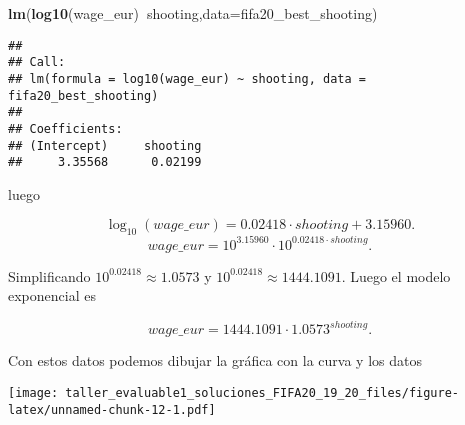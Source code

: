 \documentclass[
]{article}
\newenvironment{Shaded}{\begin{snugshade}}{\end{snugshade}}
\newcommand{\ControlFlowTok}[1]{\textcolor[rgb]{0.13,0.29,0.53}{\textbf{#1}}}
\newcommand{\DataTypeTok}[1]{\textcolor[rgb]{0.13,0.29,0.53}{#1}}
\newcommand{\DecValTok}[1]{\textcolor[rgb]{0.00,0.00,0.81}{#1}}
\newcommand{\FloatTok}[1]{\textcolor[rgb]{0.00,0.00,0.81}{#1}}
\newcommand{\KeywordTok}[1]{\textcolor[rgb]{0.13,0.29,0.53}{\textbf{#1}}}
\newcommand{\NormalTok}[1]{#1}
\newcommand{\OperatorTok}[1]{\textcolor[rgb]{0.81,0.36,0.00}{\textbf{#1}}}
\newcommand{\OtherTok}[1]{\textcolor[rgb]{0.56,0.35,0.01}{#1}}
\newcommand{\StringTok}[1]{\textcolor[rgb]{0.31,0.60,0.02}{#1}}
\begin{document}
\begin{Shaded}
\begin{Highlighting}[]
\KeywordTok{lm}\NormalTok{(}\KeywordTok{log10}\NormalTok{(wage_eur)}\OperatorTok{~}\NormalTok{shooting,}\DataTypeTok{data=}\NormalTok{fifa20_best_shooting)}
\end{Highlighting}
\end{Shaded}

\begin{verbatim}
## 
## Call:
## lm(formula = log10(wage_eur) ~ shooting, data = fifa20_best_shooting)
## 
## Coefficients:
## (Intercept)     shooting  
##     3.35568      0.02199
\end{verbatim}

luego

\[\log_{10}(wage\_eur)=  0.02418 \cdot shooting + 3.15960.\]
\[wage\_eur=  10^{3.15960}\cdot  10^{0.02418\cdot shooting}  .\]

Simplificando \(10^{0.02418}\approx1.0573\) y
\(10^{0.02418}\approx1444.1091\). Luego el modelo exponencial es

\[wage\_eur=  1444.1091\cdot 1.0573^{shooting}.\]

Con estos datos podemos dibujar la gráfica con la curva y los datos

\begin{Shaded}
\end{Shaded}

\texttt{[image: taller\_evaluable1\_soluciones\_FIFA20\_19\_20\_files/figure-latex/unnamed-chunk-12-1.pdf]}
\end{document}
